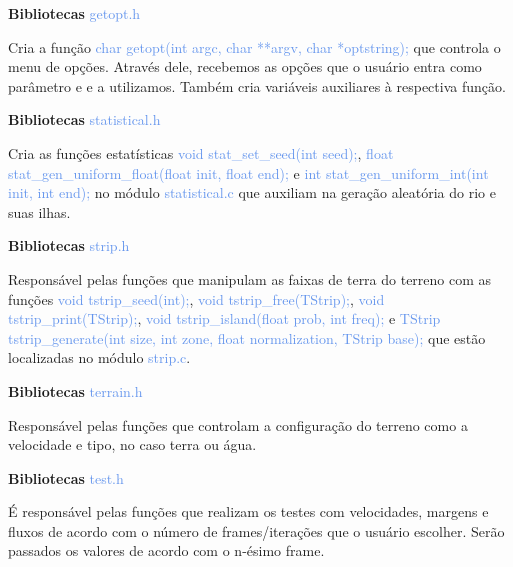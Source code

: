 \documentclass[a4paper,12pt]{article}
\begin{document}
{\Large \textcolor{NavyBlue}{ \textbf{Bibliotecas  }}}
{\large \textcolor{CornflowerBlue}{  getopt.h}}
\bigskip

Cria a função {\textcolor{CornflowerBlue}{char getopt(int argc, char **argv, char *optstring);}}
que controla o menu de opções. Através dele, recebemos as opções que o usuário entra como parâmetro e 
e a utilizamos. Também cria variáveis auxiliares à respectiva função.
\bigskip
\bigskip
\bigskip

{\Large \textcolor{NavyBlue}{ \textbf{Bibliotecas  }}}{\large \textcolor{CornflowerBlue}{  statistical.h}}
\bigskip

Cria as funções estatísticas
{\textcolor{CornflowerBlue}{void  stat\_set\_seed(int seed);}},  
{\textcolor{CornflowerBlue}{float stat\_gen\_uniform\_float(float init, float end);}} e 
{\textcolor{CornflowerBlue}{int stat\_gen\_uniform\_int(int init, int end);}} no módulo 
{\textcolor{CornflowerBlue}{statistical.c}} que auxiliam na geração aleatória do rio e suas ilhas.
\bigskip
\bigskip
\bigskip

{\Large \textcolor{NavyBlue}{ \textbf{Bibliotecas  }}}{\large \textcolor{CornflowerBlue}{  strip.h}}
\bigskip

Responsável pelas funções que manipulam as faixas de terra do terreno com as funções
{\textcolor{CornflowerBlue}{void   tstrip\_seed(int);}}, 
{\textcolor{CornflowerBlue}{void   tstrip\_free(TStrip);}}, 
{\textcolor{CornflowerBlue}{void   tstrip\_print(TStrip);}}, 
{\textcolor{CornflowerBlue}{void   tstrip\_island(float prob, int freq);}} e 
{\textcolor{CornflowerBlue}{TStrip tstrip\_generate(int size, int zone, float normalization, TStrip base);}} que estão localizadas no módulo 
{\textcolor{CornflowerBlue}{strip.c}}.
\bigskip
\bigskip
\bigskip

{\Large \textcolor{NavyBlue}{ \textbf{Bibliotecas  }}}{\large \textcolor{CornflowerBlue}{  terrain.h}}
\bigskip

Responsável pelas funções que controlam a configuração do terreno como a velocidade e tipo, no caso terra ou água.
\bigskip
\bigskip
\bigskip

{\Large \textcolor{NavyBlue}{ \textbf{Bibliotecas  }}}{\large \textcolor{CornflowerBlue}{  test.h}}
\bigskip

É responsável pelas funções que realizam os testes com velocidades, margens e fluxos de acordo com o número de frames/iterações que o usuário escolher.
Serão passados os valores de acordo com o n-ésimo frame.

\bigskip
\bigskip
\bigskip
\end{document}
